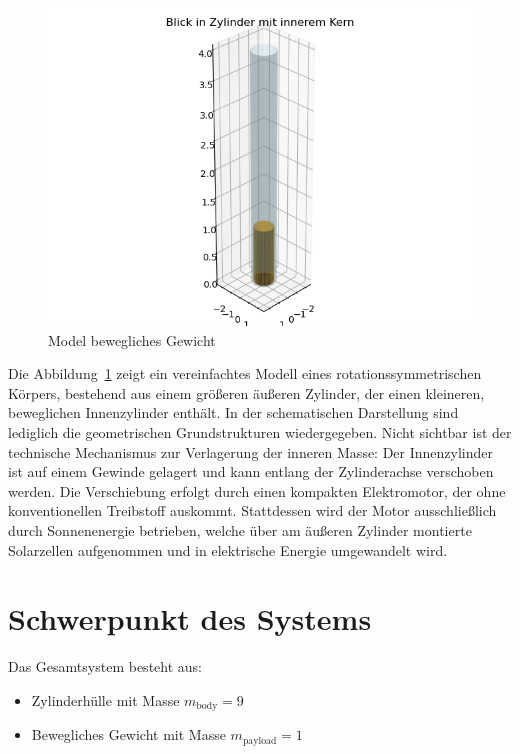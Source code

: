 \documentclass[conference]{IEEEtran}
\begin{document}
\begin{figure}
    \centering
    \includegraphics[width=\linewidth]{pics/sat_model_abstract/plot.png}
    \caption{Model bewegliches Gewicht}
    \label{fig:abstract_model}
\end{figure}


Die Abbildung~\ref{fig:abstract_model} zeigt ein vereinfachtes Modell eines rotationssymmetrischen Körpers, bestehend aus einem größeren äußeren Zylinder, der einen kleineren, beweglichen Innenzylinder enthält. In der schematischen Darstellung sind lediglich die geometrischen Grundstrukturen wiedergegeben. Nicht sichtbar ist der technische Mechanismus zur Verlagerung der inneren Masse: Der Innenzylinder ist auf einem Gewinde gelagert und kann entlang der Zylinderachse verschoben werden. Die Verschiebung erfolgt durch einen kompakten Elektromotor, der ohne konventionellen Treibstoff auskommt. Stattdessen wird der Motor ausschließlich durch Sonnenenergie betrieben, welche über am äußeren Zylinder montierte Solarzellen aufgenommen und in elektrische Energie umgewandelt wird.


\section{Schwerpunkt des Systems}
Das Gesamtsystem besteht aus:
\begin{itemize}
  \item Zylinderhülle mit Masse \( m_\text{body} = 9 \)
  \item Bewegliches Gewicht mit Masse \( m_\text{payload} = 1 \)
\end{itemize}
\end{document}

